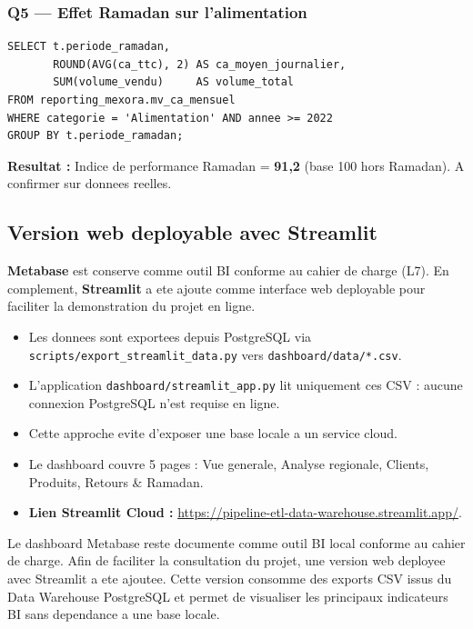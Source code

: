 \documentclass[12pt,a4paper]{article}
\begin{document}
\subsubsection{Q5 --- Effet Ramadan sur l'alimentation}

\begin{lstlisting}[style=sql, caption=Comparaison Ramadan vs hors Ramadan -- alimentation]
SELECT t.periode_ramadan,
       ROUND(AVG(ca_ttc), 2) AS ca_moyen_journalier,
       SUM(volume_vendu)     AS volume_total
FROM reporting_mexora.mv_ca_mensuel
WHERE categorie = 'Alimentation' AND annee >= 2022
GROUP BY t.periode_ramadan;
\end{lstlisting}

\textbf{Resultat :} Indice de performance Ramadan = \textbf{91,2} (base 100 hors Ramadan).
A confirmer sur donnees reelles.

\subsection{Version web deployable avec Streamlit}

\textbf{Metabase} est conserve comme outil BI conforme au cahier de charge (L7).
En complement, \textbf{Streamlit} a ete ajoute comme interface web deployable
pour faciliter la demonstration du projet en ligne.

\begin{infobox}[title=Architecture Streamlit]
\begin{itemize}[leftmargin=*]
  \item Les donnees sont exportees depuis PostgreSQL via
    \texttt{scripts/export\_streamlit\_data.py} vers \texttt{dashboard/data/*.csv}.
  \item L'application \texttt{dashboard/streamlit\_app.py} lit uniquement ces CSV :
    aucune connexion PostgreSQL n'est requise en ligne.
  \item Cette approche evite d'exposer une base locale a un service cloud.
  \item Le dashboard couvre 5 pages : Vue generale, Analyse regionale, Clients,
    Produits, Retours \& Ramadan.
  \item \textbf{Lien Streamlit Cloud :}
    \url{https://pipeline-etl-data-warehouse.streamlit.app/}.
\end{itemize}
\end{infobox}

Le dashboard Metabase reste documente comme outil BI local conforme au cahier de charge.
Afin de faciliter la consultation du projet, une version web deployee avec Streamlit a ete
ajoutee. Cette version consomme des exports CSV issus du Data Warehouse PostgreSQL et permet de
visualiser les principaux indicateurs BI sans dependance a une base locale.
\end{document}
